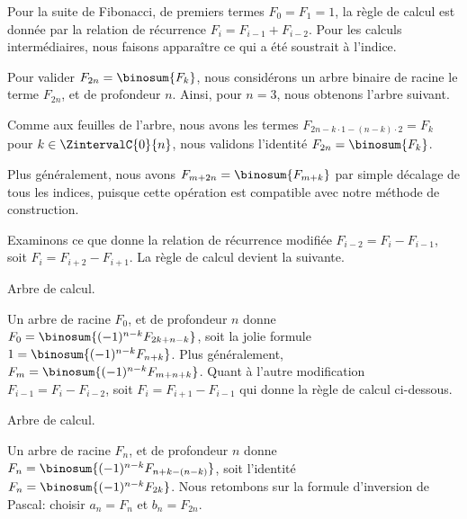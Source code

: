 Pour la suite de Fibonacci, de premiers termes $F_0 = F_1 = 1$, la règle de calcul est donnée par la relation de récurrence $F_{i} = F_{i-1} + F_{i-2}$.
%
Pour les calculs intermédiaires, nous faisons apparaître ce qui a été soustrait à l'indice.

%
            {\intertree}{}

Pour valider $F_{2n} = \binosum{F_k}$, nous considérons un arbre binaire de racine le terme $F_{2n}$, et de profondeur $n$.
Ainsi, pour $n=3$, nous obtenons l'arbre suivant.


Comme aux feuilles de l'arbre, nous avons les termes 
$F_{2n - k\cdot1 - (n-k)\cdot2} = F_k$
pour $k \in \ZintervalC{0}{n}$,
nous validons l'identité
$F_{2n} = \binosum{F_k}$.


\begin{remark}
	Plus généralement, nous avons
	$F_{m+2n} = \binosum{F_{m+k}}$
	par simple décalage de tous les indices,
	puisque cette opération est compatible avec notre méthode de construction.
\end{remark}




\begin{remark}
	Examinons ce que donne la relation de récurrence modifiée $F_{i-2} = F_{i} - F_{i-1}$, soit $F_i = F_{i+2} - F_{i+1}$.
	La règle de calcul devient la suivante.

    \begin{center}
    	\itshape\centering
        
    
        Arbre de calcul.
    \end{center}
    
    Un arbre de racine $F_0$, et de profondeur $n$ donne
    $F_{0} = \binosum{(-1)^{n-k} F_{2k + n - k}}$,
    soit la jolie formule
    $1 = \binosum{(-1)^{n-k} F_{n + k}}$.
    Plus généralement,
    $F_{m} = \binosum{(-1)^{n-k} F_{m + n + k}}$.
    Quant à l'autre modification $F_{i-1} = F_{i} - F_{i-2}$, soit $F_i = F_{i+1} - F_{i-1}$ qui donne la règle de calcul ci-dessous.

    \begin{center}
    	\itshape\centering
        
    
        Arbre de calcul.
    \end{center}
    
    Un arbre de racine $F_n$, et de profondeur $n$ donne
    $F_{n} = \binosum{(-1)^{n-k} F_{n + k - (n - k)}}$,
    soit l'identité
    $F_{n} = \binosum{(-1)^{n-k} F_{2 k}}$.
    Nous retombons sur la formule d'inversion de Pascal:
    choisir $a_n = F_n$ et $b_n = F_{2n}$. 
\end{remark}


